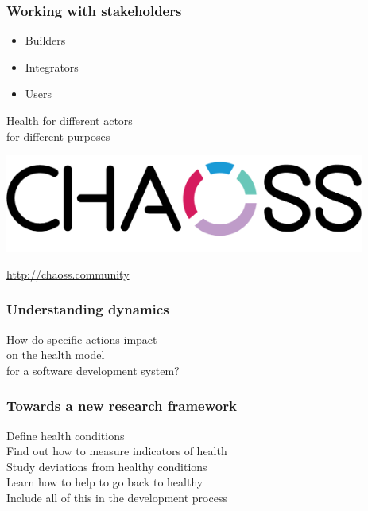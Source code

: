 \documentclass[17pt,aspectratio=169,hyperref=pdfusetitle]{beamer}
\begin{document}
\begin{frame}[fragile]
  \frametitle{Working with stakeholders}

  \begin{itemize}
  \item Builders
  \item Integrators
  \item Users
  \end{itemize}

  \vspace{.5cm}

  \begin{flushright}
  Health for different actors \\
  for different purposes \\
  \end{flushright}
  
\end{frame}

\begin{frame}[fragile]

  \begin{center}
  \includegraphics[height=3.2cm]{figs/chaoss}
  \end{center}  

  \url{http://chaoss.community}
  
\end{frame}

\begin{frame}[fragile]
  \frametitle{Understanding dynamics}

  How do specific actions impact \\
  on the health model \\
  for a software development system?
\end{frame}

\begin{frame}[fragile]
  \frametitle{Towards a new research framework}

  Define health conditions \\
  Find out how to measure indicators of health \\
  Study deviations from healthy conditions \\
  Learn how to help to go back to healthy \\

  Include all of this in the development process
\end{frame}
\end{document}
